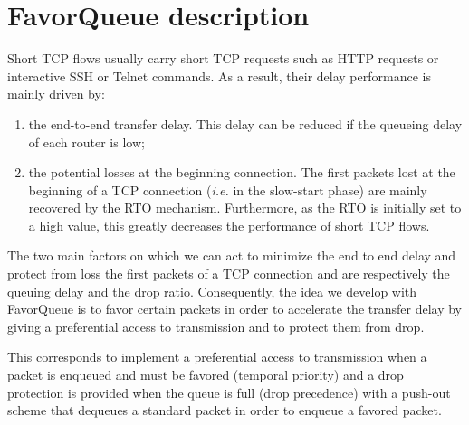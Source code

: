 \documentclass{elsart}
\begin{document}
\section{FavorQueue description}
\label{sec:description}


Short TCP flows usually carry short TCP requests such as HTTP requests or interactive SSH or Telnet commands. As a result, their delay performance is mainly driven by:
\begin{enumerate}
  \item the end-to-end transfer delay. This delay can be reduced if the queueing delay of each router is low;
  \item the potential losses at the beginning connection. The first packets lost at the beginning of a TCP connection (\textit{i.e.} in the slow-start phase) are mainly recovered by the RTO mechanism. Furthermore, as the RTO is initially set to a high value, this greatly decreases the performance of short TCP flows. 
\end{enumerate}

The two main factors on which we can act to minimize the end to end delay and protect from loss the first packets of a TCP connection and are respectively the queuing delay and the drop ratio. Consequently, the idea we develop with FavorQueue is to favor certain packets in order to accelerate the transfer delay by giving a preferential access to transmission and to protect them from drop. 

This corresponds to implement a preferential access to transmission when a packet is enqueued and must be favored (temporal priority) and a drop protection is provided when the queue is full (drop precedence) with a push-out scheme that dequeues a standard packet in order to enqueue a favored packet.
\end{document}
